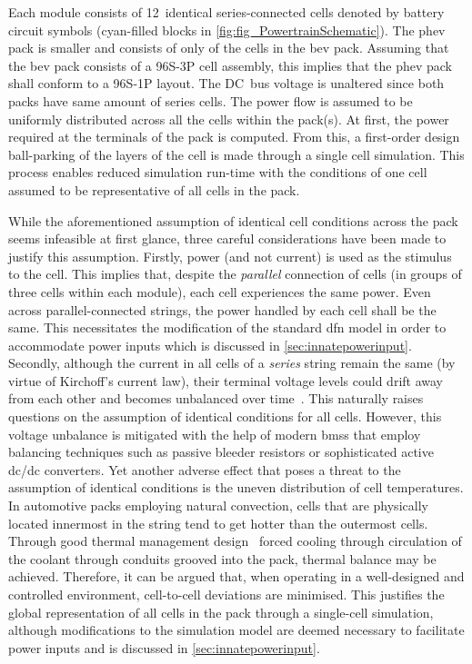 Each module consists  of 12~identical series-connected cells  denoted by battery
circuit symbols (cyan-filled  blocks in \cref{fig:fig_PowertrainSchematic}). The
\gls{phev} pack is  smaller and consists of only   of the cells in
the \gls{bev} pack. Assuming that the \gls{bev} pack consists of a \mbox{96S-3P}
cell  assembly,  this implies  that  the  \gls{phev}  pack  shall conform  to  a
\mbox{96S-1P} layout. The DC~bus voltage is unaltered since both packs have same
amount of  series cells. The power  flow is assumed to  be uniformly distributed
across all  the cells within  the pack(s). At first,  the power required  at the
terminals of the  pack is computed. From this, a  first-order design ball-parking
of the layers of the cell is made through a single cell simulation. This process
enables reduced simulation run-time with the conditions of one cell assumed to be
representative of all cells in the pack.



While the aforementioned assumption of identical cell conditions across the pack
seems infeasible at first glance, three careful considerations have been made to
justify  this assumption.  Firstly,  power  (and not  current)  is  used as  the
stimulus to the cell. This  implies that, despite the \emph{parallel} connection
of cells  (in groups of three  cells within each module),  each cell experiences
the same  power. Even  across parallel-connected strings,  the power  handled by
each cell shall be the same.  This necessitates the modification of the standard
\gls{dfn}  model in  order to  accommodate power  inputs which  is discussed  in
\cref{sec:innatepowerinput}. Secondly,  although the current  in all cells  of a
\emph{series}  string remain  the same  (by virtue  of Kirchoff's  current law),
their  terminal voltage  levels could  drift away  from each  other and  becomes
unbalanced over  time~\cite{Andrea2010}. This naturally raises  questions on the
assumption  of  identical  conditions  for  all  cells.  However,  this  voltage
unbalance is mitigated with the help of modern \glspl{bms} that employ balancing
techniques  such as  passive  bleeder resistors  or  sophisticated active  dc/dc
converters. Yet another adverse effect that  poses a threat to the assumption of
identical  conditions  is  the  uneven distribution  of  cell  temperatures.  In
automotive packs employing natural convection, cells that are physically located
innermost in  the string tend  to get hotter  than the outermost  cells. Through
good thermal management  design \eg~forced cooling through  circulation of the
coolant through conduits grooved into the pack, thermal balance may be achieved.
Therefore,  it  can be  argued  that,  when  operating  in a  well-designed  and
controlled environment,  cell-to-cell deviations  are minimised.  This justifies
the  global representation  of  all  cells in  the  pack  through a  single-cell
simulation, although modifications to the  simulation model are deemed necessary
to facilitate power inputs and is discussed in \cref{sec:innatepowerinput}.


